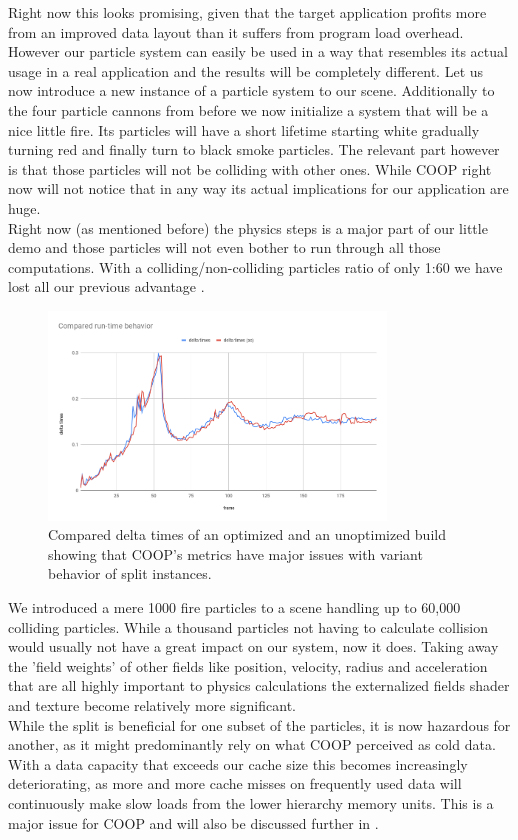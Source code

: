 Right now this looks promising, given that the target application profits more from an improved data layout than it suffers from program load overhead. However our particle system can easily be used in a way that resembles its actual usage in a real application and the results will be completely different. Let us now introduce a new instance of a particle system to our scene. Additionally to the four particle cannons from before we now initialize a system that will be a nice little fire. Its particles will have a short lifetime starting white gradually turning red and finally turn to black smoke particles. The relevant part however is that those particles will not be colliding with other ones. While COOP right now will not notice that in any way its actual implications for our application are huge.\\
Right now (as mentioned before) the physics steps is a major part of our little demo and those particles will not even bother to run through all those computations. With a colliding/non-colliding particles ratio of only 1:60 we have lost all our previous advantage .
\begin{figure}[!htbp]
	\centering
	\includegraphics[width=0.8\textwidth,height=0.6\textwidth]{PICs/delta_times_fire}
	\caption{Compared delta times of an optimized and an unoptimized build showing that COOP's metrics have major issues with variant behavior of split instances.}
	\label{delta_times_fire}
\end{figure}
We introduced a mere 1000 fire particles to a scene handling up to 60,000 colliding particles. While a thousand particles not having to calculate collision would usually not have a great impact on our system, now it does. Taking away the 'field weights' of other fields like position, velocity, radius and acceleration that are all highly important to physics calculations the externalized fields shader and texture become relatively more significant.\\
While the split is beneficial for one subset of the particles, it is now hazardous for another, as it might predominantly rely on what COOP perceived as cold data. With a data capacity that exceeds our cache size this becomes increasingly deteriorating, as more and more cache misses on frequently used data will continuously make slow loads from the lower hierarchy memory units. This is a major issue for COOP and will also be discussed further in .





